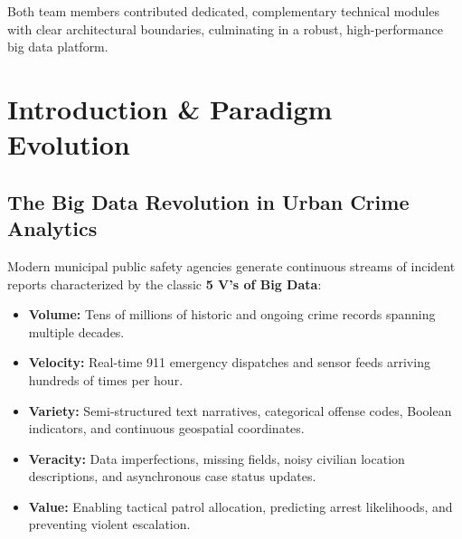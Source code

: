 \documentclass[11pt,a4paper]{article}
\begin{document}
Both team members contributed dedicated, complementary technical modules with clear architectural boundaries, culminating in a robust, high-performance big data platform.

\section{Introduction \& Paradigm Evolution}
\subsection{The Big Data Revolution in Urban Crime Analytics}
Modern municipal public safety agencies generate continuous streams of incident reports characterized by the classic \textbf{5 V's of Big Data}:
\begin{itemize}[leftmargin=*]
    \item \textbf{Volume:} Tens of millions of historic and ongoing crime records spanning multiple decades.
    \item \textbf{Velocity:} Real-time 911 emergency dispatches and sensor feeds arriving hundreds of times per hour.
    \item \textbf{Variety:} Semi-structured text narratives, categorical offense codes, Boolean indicators, and continuous geospatial coordinates.
    \item \textbf{Veracity:} Data imperfections, missing fields, noisy civilian location descriptions, and asynchronous case status updates.
    \item \textbf{Value:} Enabling tactical patrol allocation, predicting arrest likelihoods, and preventing violent escalation.
\end{itemize}
\end{document}
